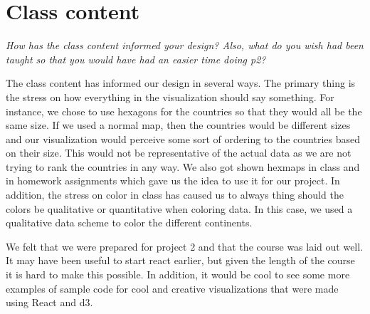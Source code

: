 \documentclass{article}
\begin{document}
\section{Class content}
\textit{How has the class content informed your design? Also, what do you wish had been taught so that you would have had an easier time doing p2?}
\newline
\par The class content has informed our design in several ways. The primary thing is the stress on how everything in the visualization should say something. For instance, we chose to use hexagons for the countries so that they would all be the same size. If we used a normal map, then the countries would be different sizes and our visualization would perceive some sort of ordering to the countries based on their size. This would not be representative of the actual data as we are not trying to rank the countries in any way. We also got shown hexmaps in class and in homework assignments which gave us the idea to use it for our project. In addition, the stress on color in class has caused us to always thing should the colors be qualitative or quantitative when coloring data. In this case, we used a qualitative data scheme to color the different continents.
\par We felt that we were prepared for project 2 and that the course was laid out well. It may have been useful to start react earlier, but given the length of the course it is hard to make this possible. In addition, it would be cool to see some more examples of sample code for cool and creative visualizations that were made using React and d3.
\end{document}
